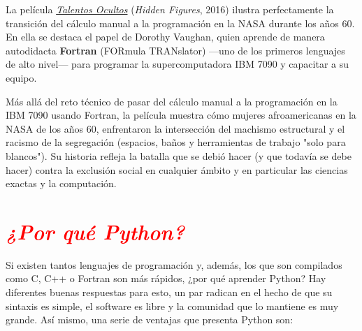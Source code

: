 \documentclass[12pt]{article}
\begin{document}
\begin{cajaflex}
    La película 
    \href{https://www.imdb.com/es/title/tt4846340/}{\textit{Talentos Ocultos}}
    (\textit{Hidden Figures}, 2016) ilustra perfectamente la 
    transición del cálculo manual a la programación en la NASA durante los años 60. 
    En ella se destaca el papel de Dorothy Vaughan, quien aprende de manera 
    autodidacta \textbf{Fortran} (FORmula TRANslator) ---uno de los primeros lenguajes de alto nivel--- 
    para programar la supercomputadora IBM 7090 y capacitar a su equipo.
    
    \vspace{0.1cm}
    Más allá del reto técnico de pasar del cálculo manual a la programación en la 
    IBM 7090 
    usando Fortran, la película muestra cómo mujeres afroamericanas 
    en la NASA de los años 60,  enfrentaron la intersección del machismo estructural y 
    el racismo de la segregación (espacios, baños y herramientas de trabajo "solo para blancos"). 
    Su historia refleja la batalla que se debió hacer (y que todavía se debe hacer) 
    contra la exclusión social en cualquier ámbito y en particular las ciencias exactas y 
    la computación.
\end{cajaflex}

\section*{\textcolor{red}{\textit{¿Por qué Python?}}}

Si existen tantos lenguajes de programación y, además, los que son compilados como C, C++ o 
Fortran son más rápidos, ¿por qué aprender Python? 
Hay diferentes buenas respuestas para esto, un par radican en el hecho de que su sintaxis es simple, 
el software es libre y la comunidad que lo mantiene es muy grande. Así mismo, una serie de 
ventajas que presenta Python son:
\end{document}

